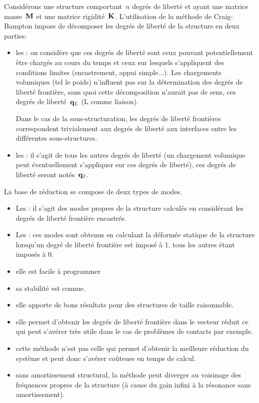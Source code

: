 Considérons une structure comportant~$n$ degrés de liberté et ayant une matrice masse~$\MM{M}$ et une matrice rigidité~$\MM{K}$. L'utilisation de la méthode de Craig-Bampton impose de décomposer les degrés de liberté de la structure en deux parties:
\begin{itemize}
  \item les : on considère que ces degrés de liberté sont ceux pouvant potentiellement être chargés au cours du temps et ceux sur lesquels s'appliquent des conditions limites (encastrement, appui simple...). Les chargements volumiques (tel le poids) n'influent pas sur la détermination des degrés de liberté frontière, sans quoi cette décomposition n'aurait pas de sens, ces degrés de liberté~$\VV{q}_L$ (L comme liaison).

	Dans le cas de la sous-structuration, les degrés de liberté frontières correspondent trivialement aux degrés de liberté aux interfaces entre les différentes sous-structures.
  \item les : il s'agit de tous les autres degrés de liberté (un chargement volumique peut éventuellement s'appliquer sur ces degrés de liberté), ces degrés de liberté seront notés~$\VV{q}_I$.
\end{itemize}
\medskipvm
La base de réduction se compose de deux types de modes.
\begin{itemize}
  \item Les : il s'agit des modes propres de la structure calculés en considérant les degrés de liberté frontière encastrés.
  \item Les : ces modes sont obtenus en calculant la déformée statique de la structure lorsqu'un degré de liberté frontière est imposé à 1, tous les autres étant imposés à 0.
\end{itemize}
\medskipvm
{}
\begin{itemize}
  \item elle est facile à programmer
  \item sa stabilité est connue.
  \item elle apporte de bons résultats pour des structures de taille raisonnable.
  \item elle permet d'obtenir les degrés de liberté frontière dans le vecteur réduit ce qui peut s'avérer très utile dans le cas de problèmes de contacts par exemple.
\end{itemize}
\medskipvm
\begin{itemize}
  \item cette méthode n'est pas celle qui permet d'obtenir la meilleure réduction du système et peut donc s'avérer coûteuse en temps de calcul.
  \item sans amortissement structural, la méthode peut diverger au voisinage des fréquences propres de la structure (à cause du gain infini à la résonance sans amortissement).
\end{itemize}


